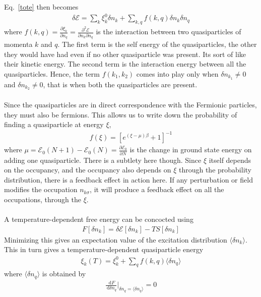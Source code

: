 \documentclass[twoside]{report}
\numberwithin{equation}{section}
\begin{document}
Eq.~\ref{tote} then becomes
\begin{equation}\begin{aligned}
\delta\mathcal{E} = \sum_k \xi^0_k \delta n_k + \sum_{k,q} f(k,q) \delta n_k \delta n_q
\end{aligned}\end{equation}
where \(f(k,q) = \frac{\partial{\xi_k}}{\partial{n_q}} = \frac{\partial^2 \mathcal{E}}{\partial n_k \partial n_q}\) is the interaction between two quasiparticles of momenta \(k\) and \(q\).
The first term is the self energy of the quasiparticles, the other they would have had even if no other quasiparticle was present.
Its sort of like their kinetic energy.
The second term is the interaction energy between all the quasiparticles.
Hence, the term \(f(k_1,k_2)\) comes into play only when \(\delta n_{k_1} \neq 0\) and \(\delta n_{k_2} \neq 0\), that is when both the quasiparticles are present.\\\\
Since the quasiparticles are in direct correspondence with the Fermionic particles, they must also be fermions.
This allows us to write down the probability of finding a quasiparticle at energy \(\xi\),
\begin{equation}\begin{aligned}
	f(\xi) = \left[e^{(\xi - \mu)\beta} + 1\right]^{-1}
\end{aligned}\end{equation}
where \(\mu = \mathcal{E_0}(N+1) - \mathcal{E_0}(N)= \frac{\partial{\mathcal{E}_0}}{\partial{N}}\) is the change in ground state energy on adding one quasiparticle.
There is a subtlety here though.
Since \(\xi\) itself depends on the occupancy, and the occupancy also depends on \(\xi\) through the probability distribution, there is a feedback effect in action here.
If any perturbation or field modifies the occupation \(n_{k\sigma}\), it will produce a feedback effect on all the occupations, through the \(\xi\).
\\\\
A temperature-dependent free energy can be concocted using
\begin{equation}\begin{aligned}
F[\delta n_k] = \delta \mathcal{E}[\delta n_k] - T S[\delta n_k]
\end{aligned}\end{equation}
Minimizing this gives an expectation value of the excitation distribution \(\langle \delta n_k\rangle\).
This in turn gives a temperature-dependent quasiparticle energy
\begin{equation}\begin{aligned}
	\label{temp_en}
	\xi_k(T) = \xi^0_k + \sum_{q} f(k,q)\langle \delta n_q\rangle
\end{aligned}\end{equation}
where \(\langle \delta n_q\rangle\) is obtained by
\begin{equation}\begin{aligned}
	\frac{\:\mathrm{d}F}{\:\mathrm{d}\delta n_q}\bigg|_{\delta n_q = \langle \delta n_{q}\rangle} = 0
\end{aligned}\end{equation}
\end{document}
